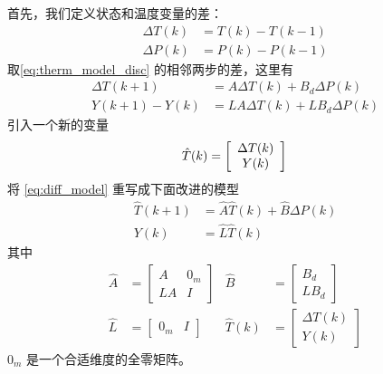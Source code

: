 首先，我们定义状态和温度变量的差：
\begin{equation}
\begin{split}
\Delta T(k) &= T(k) - T(k-1) \\
\Delta P(k) &= P(k) - P(k-1)
\end{split}
\end{equation}
取\eqref{eq:therm_model_disc} 的相邻两步的差，这里有
\begin{equation}\label{eq:diff_model}
\begin{split}
\Delta T(k+1) &= A \Delta T(k) + B_d \Delta P(k)\\
Y(k+1)-Y(k) &= L A \Delta T(k) + L B_d \Delta P(k)
\end{split}
\end{equation}
引入一个新的变量
\begin{equation*}
\hat{T}(k) =
\left[
\begin{array}{c}
\Delta T(k)\\
Y(k)
\end{array}
\right]\\
\end{equation*}
将 \eqref{eq:diff_model} 重写成下面改进的模型
\begin{equation}\label{eq:aug_model}
\begin{split}
\hat{T}(k+1) &= \hat{A}\hat{T}(k) + \hat{B}\Delta P(k)\\
Y(k) &= \hat{L}\hat{T}(k)
\end{split}
\end{equation}
其中
\begin{align*}
\hat{A} &= 
\left[
\begin{array}{cc}
A & 0_m\\
L A & I
\end{array}
\right] &
\hat{B} &= 
\left[
\begin{array}{c}
B_d\\
L B_d
\end{array}
\right]\\
\hat{L} &= 
\left[
\begin{array}{cc}
0_m & I
\end{array}
\right] &
\hat{T}(k) &= 
\left[
\begin{array}{c}
\Delta T(k)\\
Y(k)
\end{array}
\right]
\end{align*}
$0_m$ 是一个合适维度的全零矩阵。



